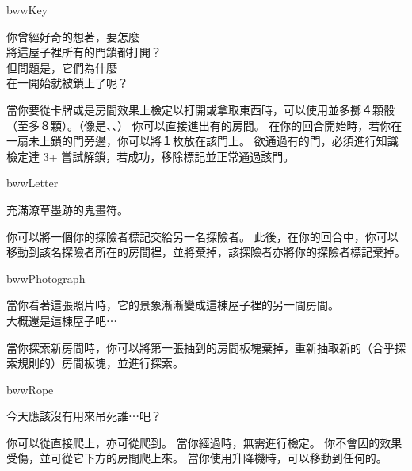 \begin{OmenCard}{bww}{Key}{}
  \begin{CardStory}
    你曾經好奇的想著，要怎麼\\
    將這屋子裡所有的門鎖都打開？\\
    但問題是，它們為什麼\\
    在一開始就被鎖上了呢？
  \end{CardStory}
  \footnotesize
  當你要從卡牌或是房間效果上檢定以打開或拿取東西時，可以使用\ThisName{}並多擲４顆骰（至多８顆）。（像是、、）\smallbreak
  你可以直接進出有的房間。\smallbreak
  在你的回合開始時，若你在一扇未上鎖的門旁邊，你可以將１枚放在該門上。\smallbreak
  欲通過有的門，必須進行知識檢定達 3+ 嘗試解鎖，若成功，移除標記並正常通過該門。
\end{OmenCard}%
\linebreak[0]%
\begin{OmenCard}{bww}{Letter}{}
  \begin{CardStory}
    充滿潦草墨跡的鬼畫符。
  \end{CardStory}
  你可以將一個你的探險者標記交給另一名探險者。\smallbreak
  此後，在你的回合中，你可以移動到該名探險者所在的房間裡，並將\ThisName{}棄掉，該探險者亦將你的探險者標記棄掉。\smallbreak
\end{OmenCard}%
\linebreak[0]%
\begin{OmenCard}{bww}{Photograph}{}
  \begin{CardStory}
    當你看著這張照片時，它的景象漸漸變成這棟屋子裡的另一間房間。\\
    大概還是這棟屋子吧⋯
  \end{CardStory}
  當你探索新房間時，你可以將第一張抽到的房間板塊棄掉，重新抽取新的（合乎探索規則的）房間板塊，並進行探索。\smallbreak
\end{OmenCard}%
\linebreak[0]%
\begin{OmenCard}{bww}{Rope}{}
  \begin{CardStory}
    今天應該沒有用來吊死誰⋯吧？
  \end{CardStory}
  你可以從直接爬上，亦可從爬到。\smallbreak
  當你經過時，無需進行檢定。\smallbreak
  你不會因的效果受傷，並可從它下方的房間爬上來。\smallbreak
  當你使用升降機時，可以移動到任何的。\smallbreak
\end{OmenCard}%
\linebreak[0]%
